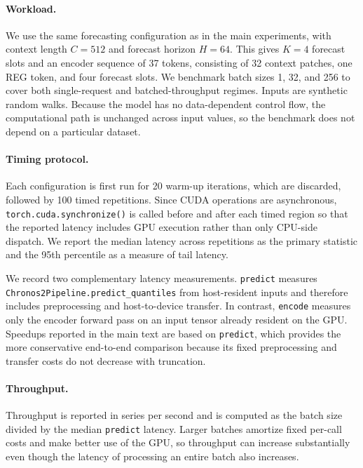 \paragraph{Workload.}
We use the same forecasting configuration as in the main experiments, with context length \(C=512\) and forecast horizon \(H=64\). This gives \(K=4\) forecast slots and an encoder sequence of 37 tokens, consisting of 32 context patches, one REG token, and four forecast slots. We benchmark batch sizes 1, 32, and 256 to cover both single-request and batched-throughput regimes. Inputs are synthetic random walks. Because the model has no data-dependent control flow, the computational path is unchanged across input values, so the benchmark does not depend on a particular dataset.

\paragraph{Timing protocol.}
Each configuration is first run for 20 warm-up iterations, which are discarded, followed by 100 timed repetitions. Since CUDA operations are asynchronous, \texttt{torch.cuda.synchronize()} is called before and after each timed region so that the reported latency includes GPU execution rather than only CPU-side dispatch. We report the median latency across repetitions as the primary statistic and the 95th percentile as a measure of tail latency.

We record two complementary latency measurements. \texttt{predict} measures \texttt{Chronos2Pipeline.predict\_quantiles} from host-resident inputs and therefore includes preprocessing and host-to-device transfer. In contrast, \texttt{encode} measures only the encoder forward pass on an input tensor already resident on the GPU. Speedups reported in the main text are based on \texttt{predict}, which provides the more conservative end-to-end comparison because its fixed preprocessing and transfer costs do not decrease with truncation.

\paragraph{Throughput.}
Throughput is reported in series per second and is computed as the batch size divided by the median \texttt{predict} latency. Larger batches amortize fixed per-call costs and make better use of the GPU, so throughput can increase substantially even though the latency of processing an entire batch also increases.

